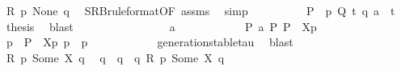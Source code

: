 \begin{isabellebody}
\ {\isacartoucheopen}R\ p\ None\ q{\isacartoucheclose}\ \isamarkupfalse%
\ SRB{\isacharunderscore}{\kern0pt}ruleformat{\isacharparenleft}{\kern0pt}{}{\isacharparenright}{\kern0pt}{\isacharbrackleft}{\kern0pt}OF\ assms{\isacharparenleft}{\kern0pt}{}{\isacharparenright}{\kern0pt}{\isacharbrackright}{\kern0pt}\ \isamarkupfalse%
\ simp\isanewline
\ \ \ \ \ \ \ \ \isamarkupfalse%
\ {\isacartoucheopen}P{\isacharprime}{\kern0pt}\ {\isacharequal}{\kern0pt}\ {\isasymtheta}{\isacharparenleft}{\kern0pt}p{\isacharparenright}{\kern0pt}{\isacartoucheclose}\ {\isacartoucheopen}Q\ {\isasymlongmapsto}\isactrlsup {\isasymtheta}t{\isacharunderscore}{\kern0pt}{\isasymepsilon}\ {\isasymtheta}{\isacharparenleft}{\kern0pt}q{\isacharparenright}{\kern0pt}{\isacartoucheclose}\ {\isacartoucheopen}a\ {\isacharequal}{\kern0pt}\ t{\isacharunderscore}{\kern0pt}{\isasymepsilon}{\isacartoucheclose}\ \isamarkupfalse%
\ {\isacharquery}{\kern0pt}thesis\ \isamarkupfalse%
\ blast\isanewline
\ \ \ \ \ \ \isamarkupfalse%
\isanewline
\ \ \ \ \ \ \ \ \isamarkupfalse%
\ {\isacartoucheopen}a\ {\isacharequal}{\kern0pt}\ {\isasymtau}{\isacartoucheclose}\isanewline
\ \ \ \ \ \ \ \ \isamarkupfalse%
\ {\isacartoucheopen}P\ {\isasymlongmapsto}\isactrlsup {\isasymtheta}a\ P{\isacharprime}{\kern0pt}{\isacartoucheclose}\ {\isacartoucheopen}P\ {\isacharequal}{\kern0pt}\ {\isasymtheta}{\isacharbrackleft}{\kern0pt}X{\isacharbrackright}{\kern0pt}{\isacharparenleft}{\kern0pt}p{\isacharparenright}{\kern0pt}{\isacartoucheclose}\ \isamarkupfalse%
\ p{\isacharprime}{\kern0pt}\ \ {\isacartoucheopen}P{\isacharprime}{\kern0pt}\ {\isacharequal}{\kern0pt}\ {\isasymtheta}{\isacharbrackleft}{\kern0pt}X{\isacharbrackright}{\kern0pt}{\isacharparenleft}{\kern0pt}p{\isacharprime}{\kern0pt}{\isacharparenright}{\kern0pt}{\isacartoucheclose}\ {\isacartoucheopen}p\ {\isasymlongmapsto}{\isasymtau}\ p{\isacharprime}{\kern0pt}{\isacartoucheclose}\isanewline
\ \ \ \ \ \ \ \ \ \ \isamarkupfalse%
\ generation{\isacharunderscore}{\kern0pt}stable{\isacharunderscore}{\kern0pt}tau\ \isamarkupfalse%
\ blast\isanewline
\ \ \ \ \ \ \ \ \isamarkupfalse%
\ {\isacartoucheopen}R\ p\ {\isacharparenleft}{\kern0pt}Some\ X{\isacharparenright}{\kern0pt}\ q{\isacartoucheclose}\ \isamarkupfalse%
\ q{\isacharprime}{\kern0pt}\ \ {\isacartoucheopen}q\ {\isasymlongmapsto}{\isasymtau}\ q{\isacharprime}{\kern0pt}{\isacartoucheclose}\ {\isacartoucheopen}R\ p{\isacharprime}{\kern0pt}\ {\isacharparenleft}{\kern0pt}Some\ X{\isacharparenright}{\kern0pt}\ q{\isacharprime}{\kern0pt}{\isacartoucheclose}\isanewline

\end{isabellebody}
